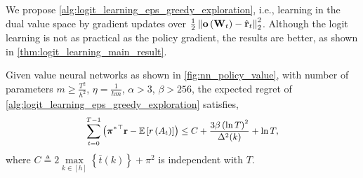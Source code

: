 We propose \cref{alg:logit_learning_eps_greedy_exploration}, i.e., learning in the dual value space by gradient updates over $\frac{1}{2} \left\| {\mathbf{o}}\left( {\mathbf{W}}_t\right) - \hat{{\mathbf{r}}}_t \right\|_2^2$. Although the logit learning is not as practical as the policy gradient, the results are better, as shown in \cref{thm:logit_learning_main_result}.

\begin{thm}
\label{thm:logit_learning_main_result}
    Given value neural networks as shown in \cref{fig:nn_policy_value}, with number of parameters $m \ge \frac{T^2}{h^2}$, $\eta = \frac{1}{h m}$, $\alpha > 3$, $\beta > 256$, the expected regret of \cref{alg:logit_learning_eps_greedy_exploration} satisfies,
\begin{equation*}
\small
\begin{split}
    \sum\limits_{t=0}^{T-1}{ \left( {\rvpi^*}^\top \rvr - \sE \left[ r\left(A_t\right) \right] \right)}  \le C + \frac{ 3 \beta \left( \ln{T} \right)^2}{\Delta^2(k)} + \ln{T},
\end{split}
\end{equation*}
where $C \triangleq 2 \max\limits_{k \in [h]}\left\{ \bar{t}(k) \right\} + \pi^2$ is independent with $T$.
\end{thm}
